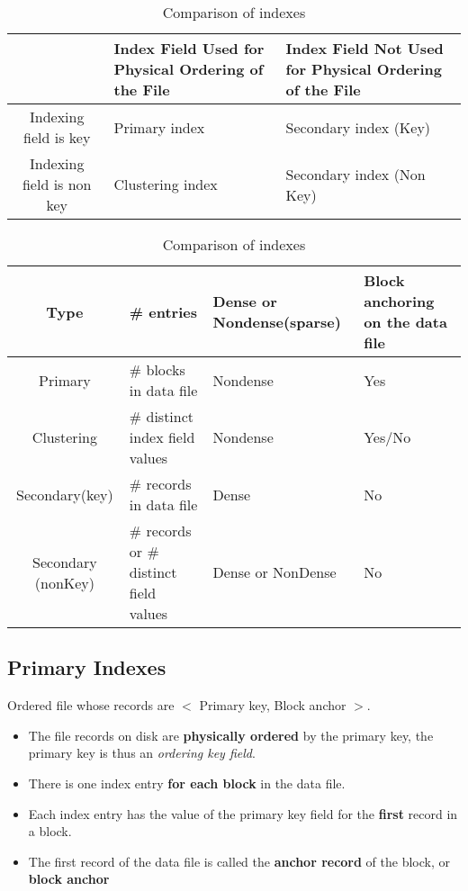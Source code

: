 \begin{table}[]
    \centering
        \begin{tabular}{c|p{5cm}|p{5cm}}
            & Index Field Used for Physical Ordering of the File & Index Field Not Used for Physical Ordering of the File\\\hline
            Indexing field is key & Primary index & Secondary index (Key) \\
            Indexing field is non key & Clustering index & Secondary index (Non Key)\\
        \end{tabular}
    \caption{Comparison of indexes}
    \label{tab:indexesCMP1}
\end{table}


\begin{table}[]
    \centering
        \begin{tabular}{c|p{3cm}|p{3cm}|p{3cm}}
            Type & \# entries & Dense or Nondense(sparse) & Block anchoring on the data file\\\hline
            Primary & \# blocks in data file & Nondense & Yes\\
            Clustering & \# distinct index field values & Nondense & Yes/No\\
            Secondary(key) & \# records in data file & Dense & No\\
            Secondary (nonKey) & \# records or \# distinct field values & Dense or NonDense & No
        \end{tabular}
    \caption{Comparison of indexes}
    \label{tab:indexesCMP2}
\end{table}




\subsection{Primary Indexes}
Ordered file whose records are $<$ Primary key, Block anchor $>$. 
\begin{itemize}
    \item The file records on disk are \textbf{physically ordered} by the primary key, the primary key is thus an \emph{ordering key field}.
    \item There is one index entry \textbf{for each block} in the data file. 
    \item Each index entry has the value of the primary key field for the \textbf{first} record in a block.
    \item The first record of the data file is called the \textbf{anchor record} of the block, or \textbf{block anchor}
\end{itemize}

